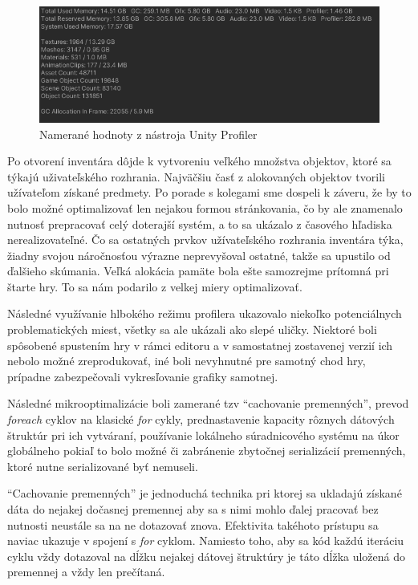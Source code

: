 \documentclass[slovak, bachelorpractice]{diploma}
\begin{document}
\begin{figure}[!htbp]
	\centering
	\includegraphics[width=1\textwidth]{Pictures/profiler.png}
	\caption{Namerané hodnoty z nástroja Unity Profiler}
	\label{pic:Prof}
\end{figure}

Po otvorení inventára dôjde k vytvoreniu veľkého množstva objektov, ktoré sa týkajú uživateľského rozhrania. Najväčšiu časť z alokovaných objektov tvorili užívateľom získané predmety. Po porade s kolegami sme dospeli k záveru, že by to bolo možné optimalizovať len nejakou formou stránkovania, čo by ale znamenalo nutnosť prepracovať celý doterajší systém, a to sa ukázalo z časového hľadiska nerealizovateľné. Čo sa ostatných prvkov užívateľského rozhrania inventára týka, žiadny svojou náročnosťou výrazne neprevyšoval ostatné, takže sa upustilo od ďalšieho skúmania. Veľká alokácia pamäte bola ešte samozrejme prítomná pri štarte hry. To sa nám podarilo z velkej miery optimalizovať.

Následné využívanie hlbokého režimu profilera ukazovalo niekoľko potenciálnych problematických miest, všetky sa ale ukázali ako slepé uličky. Niektoré boli spôsobené spustením hry v rámci editoru a v samostatnej zostavenej verzií ich nebolo možné zreprodukovať, iné boli nevyhnutné pre samotný chod hry, prípadne zabezpečovali vykresľovanie grafiky samotnej.

Následné mikrooptimalizácie boli zamerané tzv \enquote{cachovanie premenných}, prevod \textit{foreach} cyklov na klasické \textit{for} cykly, prednastavenie kapacity rôznych dátových štruktúr pri ich vytváraní, používanie lokálneho súradnicového systému na úkor globálneho pokiaľ to bolo možné či zabránenie zbytočnej serializácií premenných, ktoré nutne serializované byť nemuseli.

\enquote{Cachovanie premenných} je jednoduchá technika pri ktorej sa ukladajú získané dáta do nejakej dočasnej premennej aby sa s nimi mohlo ďalej pracovať bez nutnosti neustále sa na ne dotazovať znova. Efektivita takéhoto prístupu sa naviac ukazuje v spojení s \textit{for} cyklom. Namiesto toho, aby sa kód každú iteráciu cyklu vždy dotazoval na dĺžku nejakej dátovej štruktúry je táto dĺžka uložená do premennej a vždy len prečítaná.
\end{document}
